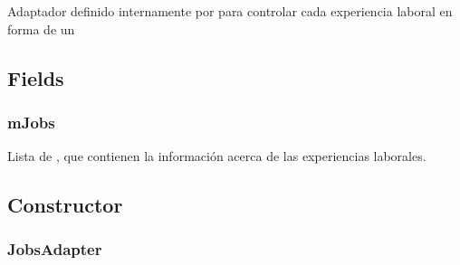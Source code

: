 \documentclass[letterpaper,10pt,english]{sphinxmanual}
\begin{document}
\begin{fulllineitems}
\label{Adapter/JobsAdapter:com.fiuba.tallerii.jobify.JobsAdapter}
Adaptador definido internamente por  para controlar cada experiencia laboral en forma de un 

\end{fulllineitems}



\subsection{Fields}
\label{Adapter/JobsAdapter:fields}

\subsubsection{mJobs}
\label{Adapter/JobsAdapter:mjobs}

\begin{fulllineitems}
\label{Adapter/JobsAdapter:com.fiuba.tallerii.jobify.JobsAdapter.mJobs}
Lista de , que contienen la información acerca de las experiencias laborales.

\end{fulllineitems}



\subsection{Constructor}
\label{Adapter/JobsAdapter:constructor}

\subsubsection{JobsAdapter}
\label{Adapter/JobsAdapter:id1}
\end{document}
